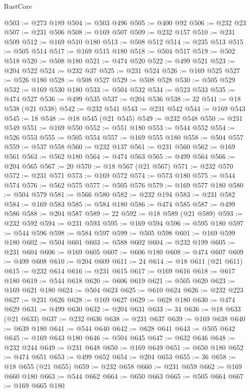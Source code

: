 \begin{lexlean}{RustCore}
\begin{coremodule}
@503 := @273 @189
@504 := @503 @496
@505 := @400 @92
@506 := @232 @23
@507 := @231 @506
@508 := @169 @507
@509 := @232 @157
@510 := @231 @509
@512 := @169 @510 @180
@513 := @508 @512
@514 := @235 @513
@515 := @505 @514
@517 := @169 @515 @180
@518 := @504 @517
@519 := @502 @518
@520 := @508 @180
@521 := @474 @520
@522 := @499 @521
@523 := @204 @522
@524 := @232 @37
@525 := @231 @524
@526 := @169 @525
@527 := @526 @180
@528 := @508 @527
@529 := @508 @528
@530 := @505 @529
@532 := @169 @530 @180
@533 := @504 @532
@534 := @523 @533
@535 := @474 @527
@536 := @499 @535
@537 := @204 @536
@538 := 32
@541 := @18 @538 (@21 @538)
@542 := @232 @541
@543 := @231 @542
@544 := @169 @543
@545 := 18
@548 := @18 @545 (@21 @545)
@549 := @232 @548
@550 := @231 @549
@551 := @169 @550
@552 := @551 @180
@553 := @544 @552
@554 := @526 @553
@555 := @505 @554
@557 := @169 @555 @180
@558 := @504 @557
@559 := @537 @558
@560 := @232 @137
@561 := @231 @560
@562 := @169 @561
@563 := @562 @180
@564 := @474 @563
@565 := @499 @564
@566 := @204 @565
@567 := 20
@570 := @18 @567 (@21 @567)
@571 := @232 @570
@572 := @231 @571
@573 := @169 @572
@574 := @573 @180
@575 := @544 @574
@576 := @562 @575
@577 := @505 @576
@579 := @169 @577 @180
@580 := @504 @579
@581 := @566 @580
@582 := @232 @194
@583 := @231 @582
@584 := @169 @583
@585 := @584 @180
@586 := @474 @585
@587 := @499 @586
@588 := @204 @587
@589 := 22
@592 := @18 @589 (@21 @589)
@593 := @232 @592
@594 := @231 @593
@595 := @169 @594
@596 := @595 @180
@597 := @544 @596
@598 := @584 @597
@599 := @505 @598
@601 := @169 @599 @180
@602 := @504 @601
@603 := @588 @602
@604 := @232 @199
@605 := @231 @604
@606 := @169 @605
@607 := @606 @180
@608 := @474 @607
@609 := @499 @608
@610 := @204 @609
@611 := 24
@614 := @18 @611 (@21 @611)
@615 := @232 @614
@616 := @231 @615
@617 := @169 @616
@618 := @617 @180
@619 := @544 @618
@620 := @606 @619
@621 := @505 @620
@623 := @169 @621 @180
@624 := @504 @623
@625 := @610 @624
@626 := @232 @223
@627 := @231 @626
@628 := @169 @627
@629 := @628 @180
@630 := @474 @629
@631 := @499 @630
@632 := @204 @631
@633 := 34
@636 := @18 @633 (@21 @633)
@637 := @232 @636
@638 := @231 @637
@639 := @169 @638
@640 := @639 @180
@641 := @544 @640
@642 := @628 @641
@643 := @505 @642
@645 := @169 @643 @180
@646 := @504 @645
@647 := @632 @646
@648 := @232 @244
@649 := @231 @648
@650 := @169 @649
@651 := @650 @180
@652 := @474 @651
@653 := @499 @652
@654 := @204 @653
@655 := 36
@658 := @18 @655 (@21 @655)
@659 := @232 @658
@660 := @231 @659
@662 := @169 @660 @180
@663 := @544 @662
@664 := @650 @663
@665 := @505 @664
@667 := @169 @665 @180

\end{coremodule}
\end{lexlean}
